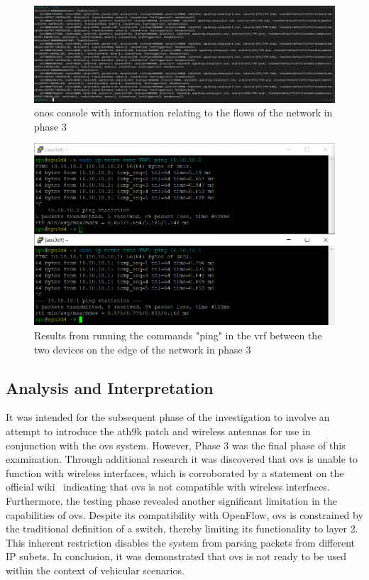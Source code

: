 \begin{figure}
	\centering
	\includegraphics[width=\textwidth]{Chapters/Figures/tests/ovs_phase_4/onos_flows.PNG}
	\caption{\gls{onos} console with information relating to the flows of the network in phase 3}
	\label{fig:exp1_phase4_onos_flows}
\end{figure}

\begin{figure}
	\centering
	\includegraphics[width=\textwidth]{Chapters/Figures/tests/ovs_phase_4/pings.PNG}
	\caption{Results from running the commands "ping" in the \gls{vrf} between the two devices on the edge of the network in phase 3}
	\label{fig:exp1_phase4_pings}
\end{figure}

\subsection{Analysis and Interpretation}
It was intended for the subsequent phase of the investigation to involve an attempt to introduce the ath9k patch and wireless antennas for use in conjunction with the \gls{ovs} system. However, Phase 3 was the final phase of this examination. Through additional research it was discovered that \gls{ovs} is unable to function with wireless interfaces, which is corroborated by a statement on the official wiki~\cite{noauthor_common_nodate} indicating that \gls{ovs} is not compatible with wireless interfaces.
Furthermore, the testing phase revealed another significant limitation in the capabilities of \gls{ovs}. Despite its compatibility with OpenFlow, \gls{ovs} is constrained by the traditional definition of a switch, thereby limiting its functionality to layer 2. This inherent restriction disables the system from parsing packets from different IP subets.
In conclusion, it was demonstrated that \gls{ovs} is not ready to be used within the context of vehicular scenarios. 

